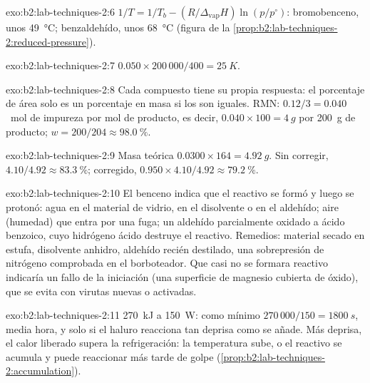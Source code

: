 \begin{solution}{exo:b2:lab-techniques-2:6}
$1/T = 1/T_b - (R/\Delta_{\mathrm{vap}}H)\ln(p/p^\circ)$: bromobenceno, unos \qty{49}{\degreeCelsius};
benzaldehído, unos \qty{68}{\degreeCelsius} (figura de la \cref{prop:b2:lab-techniques-2:reduced-pressure}).
\end{solution}

\begin{solution}{exo:b2:lab-techniques-2:7}
$0.050 \times 200\,000/400 = \qty{25}{K}$.
\end{solution}

\begin{solution}{exo:b2:lab-techniques-2:8}
Cada compuesto tiene su propia respuesta: el porcentaje de área solo es un porcentaje en masa si los  son
iguales. RMN: $0.12/3 = 0.040$~mol de impureza por mol de producto, es decir, $0.040 \times 100 = \qty{4}{g}$
por \qty{200}{g} de producto; $w = 200/204 \approx 98.0~\%$.
\end{solution}

\begin{solution}{exo:b2:lab-techniques-2:9}
Masa teórica $0.0300 \times 164 = \qty{4.92}{g}$. Sin corregir, $4.10/4.92 \approx 83.3~\%$; corregido,
$0.950 \times 4.10/4.92 \approx 79.2~\%$.
\end{solution}

\begin{solution}{exo:b2:lab-techniques-2:10}
El benceno indica que el reactivo se formó y luego se protonó: agua en el material de vidrio, en el disolvente o en el
aldehído; aire (humedad) que entra por una fuga; un aldehído parcialmente oxidado a ácido benzoico, cuyo
hidrógeno ácido destruye el reactivo. Remedios: material secado en estufa, disolvente anhidro, aldehído recién
destilado, una sobrepresión de nitrógeno comprobada en el borboteador. Que casi no se formara reactivo indicaría un
fallo de la iniciación (una superficie de magnesio cubierta de óxido), que se evita con virutas nuevas o activadas.
\end{solution}

\begin{solution}{exo:b2:lab-techniques-2:11}
\qty{270}{kJ} a \qty{150}{W}: como mínimo $270\,000/150 = \qty{1800}{s}$, media hora, y solo si el
haluro reacciona tan deprisa como se añade. Más deprisa, el calor liberado supera la refrigeración: la temperatura sube,
o el reactivo se acumula y puede reaccionar más tarde de golpe (\cref{prop:b2:lab-techniques-2:accumulation}).
\end{solution}


